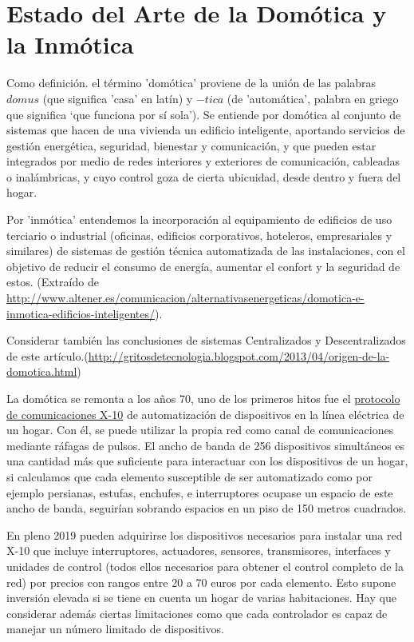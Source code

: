 \cleardoublepage

\chapter{Estado del Arte de la Domótica y la Inmótica}
\label{ch:Capitulo2}

Como definición. el término 'domótica' proviene de la unión de las palabras $domus$ (que significa 'casa' en latín) y $-tica$ (de 'automática', palabra en griego que significa ‘que funciona por sí sola’). Se entiende por domótica al conjunto de sistemas que hacen de una vivienda un edificio inteligente, aportando servicios de gestión energética, seguridad, bienestar y comunicación, y que pueden estar integrados por medio de redes interiores y exteriores de comunicación, cableadas o inalámbricas, y cuyo control goza de cierta ubicuidad, desde dentro y fuera del hogar.

Por 'inmótica' entendemos la incorporación al equipamiento de edificios de uso terciario o industrial (oficinas, edificios corporativos, hoteleros, empresariales y similares) de sistemas de gestión técnica automatizada de las instalaciones, con el objetivo de reducir el consumo de energía, aumentar el confort y la seguridad de estos.
(Extraído de \url{http://www.altener.es/comunicacion/alternativasenergeticas/domotica-e-inmotica-edificios-inteligentes/}).

Considerar también las conclusiones de sistemas Centralizados y Descentralizados de este artículo.(\url{http://gritosdetecnologia.blogspot.com/2013/04/origen-de-la-domotica.html})

La domótica se remonta a los años 70, uno de los primeros hitos fue el \href{https://es.wikipedia.org/wiki/X10}{protocolo de comunicaciones X-10} de automatización de dispositivos en la línea eléctrica de un hogar. Con él, se puede utilizar la propia red como canal de comunicaciones mediante ráfagas de pulsos. El ancho de banda de 256 dispositivos simultáneos es una cantidad más que suficiente para interactuar con los dispositivos de un hogar, si calculamos que cada elemento susceptible de ser automatizado como por ejemplo persianas, estufas, enchufes, e interruptores ocupase un espacio de este ancho de banda, seguirían sobrando espacios en un piso de 150 metros cuadrados.

En pleno 2019 pueden adquirirse los dispositivos necesarios para instalar una red X-10 que incluye interruptores, actuadores, sensores, transmisores, interfaces y unidades de control (todos ellos necesarios para obtener el control completo de la red) por precios con rangos entre 20 a 70 euros por cada elemento. Esto supone inversión elevada si se tiene en cuenta un hogar de varias habitaciones. Hay que considerar además ciertas limitaciones como que cada controlador es capaz de manejar un número limitado de dispositivos.

